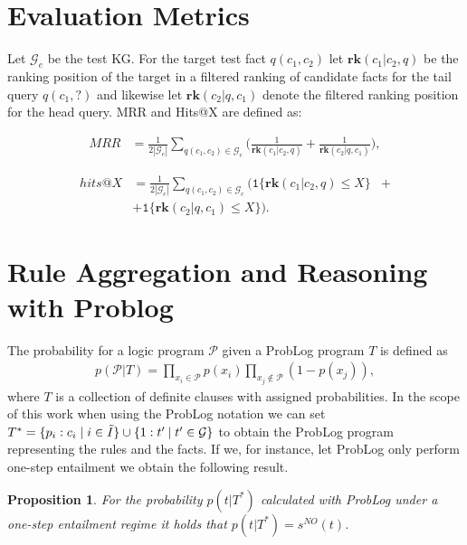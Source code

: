 \documentclass{article}
\theoremstyle{plain}
\newtheorem{proposition}[theorem]{Proposition}
\theoremstyle{remark}
\newcommand{\atomrule}{c}
\newcommand{\alltriples}{\mathcal{G}}
\newcommand{\indexSetAll}{\Tilde{I}}
\newcommand{\probloglogicprogram}{\mathcal{P}}
\begin{document}
\section{Evaluation Metrics}
Let $\mathcal{G}_e$ be the test KG. For the target test fact $q(c_1,c_2)$ let $\mathbf{rk}(c_1|c_2,q)$ be the ranking position of the target in a filtered ranking of candidate facts for the tail query $q(c_1,?)$ and likewise let $\mathbf{rk}(c_2|q,c_1)$ denote the filtered ranking position for the head query. MRR and Hits@X are defined as: 

{\begin{align*}
    MRR &= \frac{1}{2 |\mathcal{G}_e|} \sum_{q(c_1,c_2) \in \mathcal{G}_e} \bigg( \frac{1}{\mathbf{rk}(c_1|c_2,q)} + \frac{1}{\mathbf{rk}(c_2|q,c_1)} \bigg),
\end{align*}

\begin{align*}
     hits@X &= \frac{1}{2 |\mathcal{G}_e|} \sum_{q(c_1,c_2) \in \mathcal{G}_e} \bigg(  \mathtt{1}\big\{\mathbf{rk}(c_1|c_2,q) \leq X \big\}
     &+ \\
     &+\mathtt{1} \big\{\mathbf{rk}(c_2|q,c_1)\leq X \big\} \bigg).
\end{align*}


\section{Rule Aggregation and Reasoning with Problog}\label{sec: reasoning and aggregation}
The probability for a logic program $\probloglogicprogram$ given a ProbLog program $T$ is defined as  
\begin{align}
    p( \probloglogicprogram | T) = \prod_{x_i \in \probloglogicprogram} p(x_i) \prod_{x_j \not\in \probloglogicprogram} (1-p(x_j)), \label{eq: problog program prob}
\end{align}
\noindent where $T$ is a collection of definite clauses with assigned probabilities. In the scope of this work when using the ProbLog notation we can set $T^* = \{p_i: \atomrule_i \;|\; i \in \indexSetAll \} \cup \{1:t' \:|\; t' \in \alltriples\}$ to obtain the ProbLog program representing the rules and the facts. If we, for instance, let ProbLog only perform one-step entailment we obtain the following result.

\begin{proposition} \label{prop: problog one step}
    For the probability $p(t | T^*)$ calculated with ProbLog under a one-step entailment regime it holds that $p(t | T^*)=s^{NO}(t)$.
\end{proposition}


}
\end{document}
